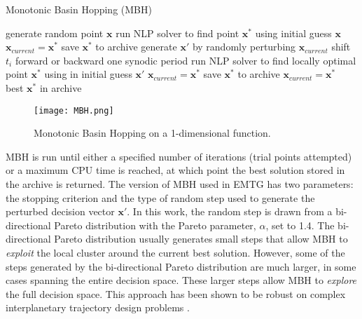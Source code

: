 \begin{algorithm}
	\caption{Monotonic Basin Hopping (\acs{MBH})\label{alg:MBH}}
	\begin{algorithmic}
		\State generate random point $\mathbf{x}$
		\State run NLP solver to find point $\mathbf{x}^*$ using initial guess $\mathbf{x}$
		\State $\mathbf{x}_{current} = \mathbf{x}^*$
		\State save $\mathbf{x}^*$ to archive
		\EndIf
		\State generate $\mathbf{x}'$ by randomly perturbing $\mathbf{x}_{current}$
		\State shift $t_i$ forward or backward one synodic period
		\EndIf
		\EndFor
		\State run NLP solver to find locally optimal point $\mathbf{x}^*$ using in initial guess $\mathbf{x}'$
		\State $\mathbf{x}_{current} = \mathbf{x}^*$
		\State save $\mathbf{x}^*$ to archive
		\State $\mathbf{x}_{current} = \mathbf{x}^*$
		\EndIf
		\EndWhile	\\			
		\Return best $\mathbf{x}^*$ in archive
	\end{algorithmic}
\end{algorithm}

\begin{figure}
	\centering
	\texttt{[image: MBH.png]}
	\caption{ Monotonic Basin Hopping on a 1-dimensional function.}
	\label{fig:MBH}
\end{figure}

\ac{MBH} is run until either a specified number of iterations (trial points attempted) or a maximum CPU time is reached, at which point the best solution stored in the archive is returned. The version of \ac{MBH} used in EMTG has two parameters: the stopping criterion and the type of random step used to generate the perturbed decision vector $\mathbf{x}'$. In this work, the random step is drawn from a bi-directional Pareto distribution with the Pareto parameter, $\alpha$, set to 1.4. The bi-directional Pareto distribution usually generates small steps that allow \ac{MBH} to \textit{exploit} the local cluster around the current best solution. However, some of the steps generated by the bi-directional Pareto distribution are much larger, in some cases spanning the entire decision space. These larger steps allow \ac{MBH} to \textit{explore} the full decision space. This approach has been shown to be robust on complex interplanetary trajectory design problems \cite{MBH_ISSFD_2014}.

